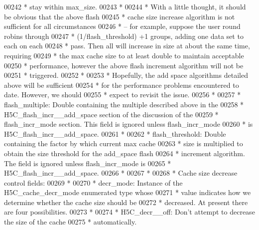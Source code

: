 \begin{DoxyCode}
00242 \textcolor{comment}{ *      stay within max\_size.}
00243 \textcolor{comment}{ *}
00244 \textcolor{comment}{ *      With a little thought, it should be obvious that the above flash}
00245 \textcolor{comment}{ *      cache size increase algorithm is not sufficient for all circumstances}
00246 \textcolor{comment}{ *      -- for example, suppose the user round robins through}
00247 \textcolor{comment}{ *      (1/flash\_threshold) +1 groups, adding one data set to each on each}
00248 \textcolor{comment}{ *      pass.  Then all will increase in size at about the same time, requiring}
00249 \textcolor{comment}{ *      the max cache size to at least double to maintain acceptable}
00250 \textcolor{comment}{ *      performance, however the above flash increment algorithm will not be}
00251 \textcolor{comment}{ *      triggered.}
00252 \textcolor{comment}{ *}
00253 \textcolor{comment}{ *      Hopefully, the add space algorithms detailed above will be sufficient}
00254 \textcolor{comment}{ *      for the performance problems encountered to date.  However, we should}
00255 \textcolor{comment}{ *      expect to revisit the issue.}
00256 \textcolor{comment}{ *}
00257 \textcolor{comment}{ * flash\_multiple: Double containing the multiple described above in the}
00258 \textcolor{comment}{ *      H5C\_flash\_incr\_\_add\_space section of the discussion of the}
00259 \textcolor{comment}{ *      flash\_incr\_mode section.  This field is ignored unless flash\_incr\_mode}
00260 \textcolor{comment}{ *      is H5C\_flash\_incr\_\_add\_space.}
00261 \textcolor{comment}{ *}
00262 \textcolor{comment}{ * flash\_threshold: Double containing the factor by which current max cache}
00263 \textcolor{comment}{ *      size is multiplied to obtain the size threshold for the add\_space flash}
00264 \textcolor{comment}{ *      increment algorithm.  The field is ignored unless flash\_incr\_mode is}
00265 \textcolor{comment}{ *      H5C\_flash\_incr\_\_add\_space.}
00266 \textcolor{comment}{ *}
00267 \textcolor{comment}{ *}
00268 \textcolor{comment}{ * Cache size decrease control fields:}
00269 \textcolor{comment}{ *}
00270 \textcolor{comment}{ * decr\_mode: Instance of the H5C\_cache\_decr\_mode enumerated type whose}
00271 \textcolor{comment}{ *      value indicates how we determine whether the cache size should be}
00272 \textcolor{comment}{ *      decreased.  At present there are four possibilities.}
00273 \textcolor{comment}{ *}
00274 \textcolor{comment}{ *      H5C\_decr\_\_off:  Don't attempt to decrease the size of the cache}
00275 \textcolor{comment}{ *              automatically.}

\end{DoxyCode}
